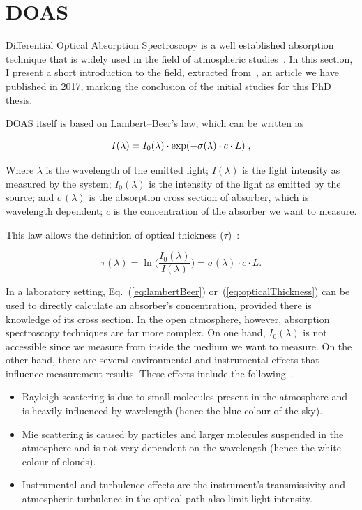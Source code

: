 
\section{DOAS}%
\label{sec:doas}

Differential Optical Absorption Spectroscopy is a well established
absorption technique that is widely used in the field of atmospheric
studies~\cite{Platt2007}. In this section, I present a short
introduction to the field, extracted from~\cite{ValentedeAlmeida2017},
an article we have published in 2017, marking the conclusion of the
initial studies for this PhD thesis.

DOAS itself is based on Lambert--Beer's law, which can be written as
\cite{Platt2007}

\begin{equation}
  \centering
  \label{eq:lambertBeer}
  I(\lambda) = I_0 (\lambda) \cdot \exp(-\sigma(\lambda) \cdot c \cdot L) \;,
\end{equation}

Where $\lambda$ is the wavelength of the emitted light; $I(\lambda)$ is
the light intensity as measured by the system; $I_{0}(\lambda)$ is the
intensity of the light as emitted by the source; and $\sigma(\lambda)$
is the absorption cross section of absorber, which is wavelength
dependent; $c$ is the concentration of the absorber we want to measure.

This law allows the definition of optical thickness
($\tau$)~\cite{Platt2007}:

\begin{equation}
      \label{eq:opticalThickness}
      \tau(\lambda) = \ln \bigg( \frac{I_{0}(\lambda)}{I(\lambda)}\bigg)
      = \sigma(\lambda) \cdot c \cdot L.
\end{equation}

In a laboratory setting, Eq.~(\ref{eq:lambertBeer})
or~(\ref{eq:opticalThickness}) can be used to directly calculate an
absorber's concentration, provided there is knowledge of  its cross
section. In the open atmosphere, however, absorption spectroscopy
techniques are far more complex. On one hand, $I_0(\lambda)$ is not
accessible since we measure from inside the medium we want to measure.
On the other hand, there are several environmental and instrumental
effects that influence measurement results. These effects include the
following~\cite{Platt2007}.

\begin{itemize}
      \item Rayleigh scattering is due to small molecules present in the
          atmosphere and is heavily influenced by wavelength (hence the
          blue colour of the
      sky).
      \item Mie scattering is caused by particles and larger molecules
          suspended in the atmosphere and is not very dependent
      on the wavelength (hence the white colour of clouds).
      \item Instrumental and turbulence effects are the instrument's
          transmissivity and atmospheric turbulence in the optical path
          also limit light intensity.
  \end{itemize}

